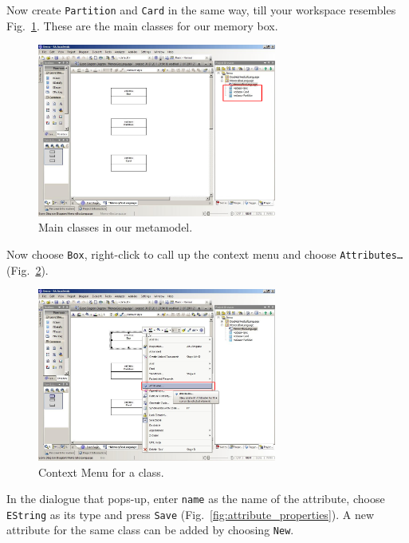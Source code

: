 Now create \texttt{Partition} and \texttt{Card} in the same way, till your
workspace resembles Fig.~\ref{fig:all_eclasses}.  These are the main classes for
our memory box.

\begin{figure}[htbp]
	\centering
  \includegraphics[width=0.7\textwidth]{pics/memBoxBilder/memBox10.png}
	\caption{Main classes in our metamodel.}
	\label{fig:all_eclasses}
\end{figure}

Now choose \texttt{Box}, right-click to call up the context menu and choose
\texttt{Att\-ri\-butes\ldots} (Fig.~\ref{fig:attribute}).

\begin{figure}[htbp]
	\centering
  \includegraphics[width=0.7\textwidth]{pics/memBoxBilder/memBox11.png}
	\caption{Context Menu for a class.}
	\label{fig:attribute}
\end{figure}

\clearpage

In the dialogue that pops-up, enter \texttt{name} as the name of the attribute,
choose \texttt{EString} as its type and press \texttt{Save}
(Fig.~\ref{fig:attribute_properties}).  A new attribute for the same class can
be added by choosing \texttt{New}.

